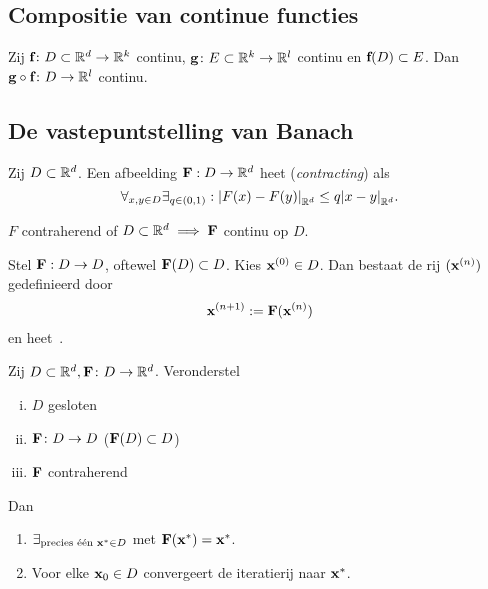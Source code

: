 \documentclass{2wa40summary}
\begin{document}
	\subsection{Compositie van continue functies}
	\theorem Zij ${\textbf{f}}\colon D\subset\mathbb{R}^d\rightarrow \mathbb{R}^k$ continu, ${\textbf{g}}\colon E\subset\mathbb{R}^k\rightarrow \mathbb{R}^l$ continu en ${\textbf{f}}(D) \subset E$. Dan ${\textbf{g}} \circ {\textbf{f}}\colon D\rightarrow \mathbb{R}^l$ continu.
	
	\subsection{De vastepuntstelling van Banach}
	\begin{theorem}
		Zij $D \subset \mathbb{R}^d$.
		Een afbeelding ${\textbf{F}}:D \rightarrow \mathbb{R}^d$ heet  (\textit{contracting}) als
		\[\forall _{x,y\in D}\exists _{q \in (0,1)}:{\left|F(x)-F(y)\right|}_{\mathbb{R}^d} \leq q{\left|x-y\right|}_{\mathbb{R}^d}. \]
	\end{theorem}
	
	
	\gevolg $F$ contraherend of $D\subset\mathbb{R}^d\implies{\textbf{F}}$ continu op $D$.
	
	
	\begin{define}[iteratierij]
		Stel ${\textbf{F}}:D\rightarrow D$, oftewel ${\textbf{F}}(D) \subset D$. Kies  ${\textbf{x}}^{(0)} \in D$.
		Dan bestaat de rij $({\textbf{x}}^{(n)})$ gedefinieerd door
		\[
		{\textbf{x}}^{(n+1)} := {\textbf{F}}({\textbf{x}}^{(n)})
		\]
		en heet~.
	\end{define}
	
	
	
	Zij $D \subset \mathbb{R}^d, {\textbf{F}}\colon D\rightarrow \mathbb{R}^d$. Veronderstel
	\begin{enumerate}[(i)]
		\item $D$ gesloten
		\item ${\textbf{F}}\colon D \rightarrow D$ (${\textbf{F}}(D) \subset D$)
		\item ${\textbf{F}}$ contraherend
	\end{enumerate}
	Dan
	\begin{enumerate}[(1)]
		\item $\exists_{\text{precies \'e\'en } {\textbf{x}}^* \in D}$ met ${\textbf{F}}({\textbf{x}}^*)={\textbf{x}}^*$.
		\item Voor elke ${\textbf{x}}_0 \in D$ convergeert de iteratierij naar ${\textbf{x}}^*$.
	\end{enumerate}
	
\end{document}
